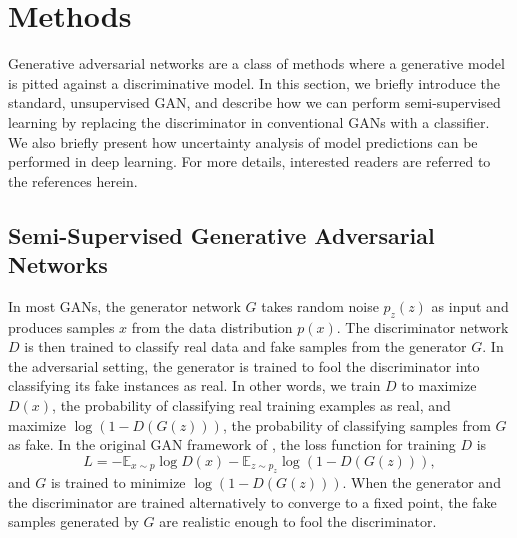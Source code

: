 \documentclass[fleqn,usenatbib]{mnras}
\begin{document}

\section{Methods}
  \label{sec:methods}
  
Generative adversarial networks \citep[GANs;][]{goodfellow2014generative} are a class of methods where
a generative model is pitted against a discriminative model.
In this section, we briefly introduce the standard, unsupervised GAN, and describe how we can perform semi-supervised learning
by replacing the discriminator in conventional GANs with a classifier.
We also briefly present how uncertainty analysis of model predictions can be performed in deep learning.
For more details, interested readers are referred to the references herein.

\subsection{Semi-Supervised Generative Adversarial Networks}

In most GANs, the generator network $G$ takes random noise $p_z \left( z \right)$
as input and produces samples $x$ from the data distribution $p \left( x \right)$.
The discriminator network $D$ is then trained to classify real data and fake samples
from the generator $G$.
In the adversarial setting, the generator is trained to fool the discriminator into classifying its
fake instances as real.
In other words, we train $D$ to maximize $D \left( x \right)$,
the probability of classifying real training examples as real,
and maximize $\log \left( 1 - D \left( G \left( z \right) \right) \right)$,
the probability of classifying samples from $G$ as fake.
In the original GAN framework of \citet{goodfellow2014generative}, the loss function for training $D$ is
\begin{equation}
  L = - \mathbb{E}_{x \sim p} \log D \left( x \right)
      - \mathbb{E}_{z \sim p_z} \log \left( 1 - D \left( G \left( z \right) \right) \right),
  \label{eq:original_gan_loss}
\end{equation}
and $G$ is trained to minimize $\log \left( 1 - D \left( G \left( z \right) \right) \right)$.
When the generator and the discriminator are trained alternatively to converge to a fixed point,
the fake samples generated by $G$ are realistic enough to fool the discriminator.
\end{document}
